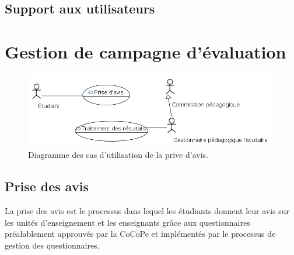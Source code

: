 \documentclass[a4paper,11pt]{report}
\begin{document}
\subsection{Support aux utilisateurs}
























\newpage
\section{Gestion de campagne d'évaluation}

\begin{figure}[ht]
\includegraphics[width=\linewidth]{workspace/evalens-usecases/prise_avis.png}
\caption{Diagramme des cas d'utilisation de la prive d'avis.}
\label{fig:usecase-avis}
\end{figure}

\subsection{Prise des avis}
La prise des avis est le processus dans lequel les étudiants donnent leur avis sur les unités d'enseignement et les enseignants grâce aux questionnaires préalablement approuvés par la CoCoPe et implémentés par le processus de gestion des questionnaires.
\end{document}
